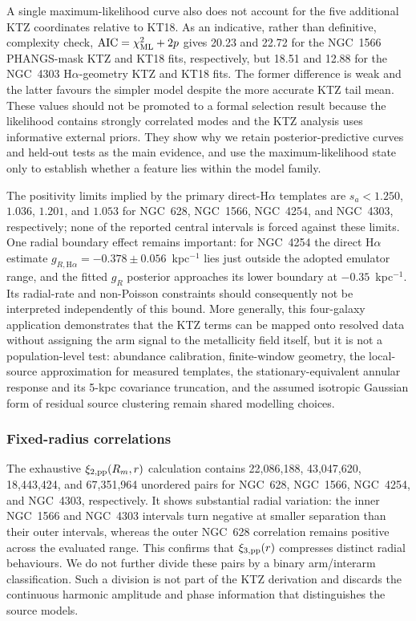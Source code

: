 \documentclass[fleqn,usenatbib]{mnras}
\begin{document}
A single maximum-likelihood curve also does not account for the five additional KTZ coordinates relative to KT18.  As an indicative, rather than definitive, complexity check, $\mathrm{AIC}=\chi^2_{\rm ML}+2p$ gives 20.23 and 22.72 for the NGC~1566 PHANGS-mask KTZ and KT18 fits, respectively, but 18.51 and 12.88 for the NGC~4303 H$\alpha$-geometry KTZ and KT18 fits.  The former difference is weak and the latter favours the simpler model despite the more accurate KTZ tail mean.  These values should not be promoted to a formal selection result because the likelihood contains strongly correlated modes and the KTZ analysis uses informative external priors.  They show why we retain posterior-predictive curves and held-out tests as the main evidence, and use the maximum-likelihood state only to establish whether a feature lies within the model family.

The positivity limits implied by the primary direct-H$\alpha$ templates are $s_a<1.250$, $1.036$, $1.201$, and $1.053$ for NGC~628, NGC~1566, NGC~4254, and NGC~4303, respectively; none of the reported central intervals is forced against these limits.  One radial boundary effect remains important: for NGC~4254 the direct H$\alpha$ estimate $g_{R,\mathrm{H}\alpha}=-0.378\pm0.056$~kpc$^{-1}$ lies just outside the adopted emulator range, and the fitted $g_R$ posterior approaches its lower boundary at $-0.35$~kpc$^{-1}$.  Its radial-rate and non-Poisson constraints should consequently not be interpreted independently of this bound.  More generally, this four-galaxy application demonstrates that the KTZ terms can be mapped onto resolved data without assigning the arm signal to the metallicity field itself, but it is not a population-level test: abundance calibration, finite-window geometry, the local-source approximation for measured templates, the stationary-equivalent annular response and its 5-kpc covariance truncation, and the assumed isotropic Gaussian form of residual source clustering remain shared modelling choices.

\subsubsection{Fixed-radius correlations}
\label{sssec:phangs_xi2_results}

The exhaustive $\xi_{2,{\rm pp}}(R_m,r)$ calculation contains 22,086,188, 43,047,620, 18,443,424, and 67,351,964 unordered pairs for NGC~628, NGC~1566, NGC~4254, and NGC~4303, respectively.  It shows substantial radial variation: the inner NGC~1566 and NGC~4303 intervals turn negative at smaller separation than their outer intervals, whereas the outer NGC~628 correlation remains positive across the evaluated range.  This confirms that $\xi_{3,{\rm pp}}(r)$ compresses distinct radial behaviours.  We do not further divide these pairs by a binary arm/interarm classification.  Such a division is not part of the KTZ derivation and discards the continuous harmonic amplitude and phase information that distinguishes the source models.
\end{document}
